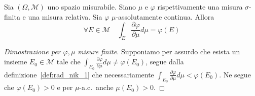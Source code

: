 \begin{theorem}\label{thm:rad_nik_ac}
    Sia \((\Omega, \mathcal{M})\) uno spazio misurabile. Siano \(\mu\) e
    \(\varphi\) rispettivamente una misura \(\sigma\)-finita e una misura
    relativa. Sia \(\varphi \) \(\mu\)-assolutamente continua. Allora
    \[
        \forall E \in \mathcal{M} \quad \int_E \frac{\partial \varphi }{\partial
        \mu} d\mu = \varphi(E)
    \]
\end{theorem}
\begin{proof}[Dimostrazione per \(\varphi , \mu\) misure finite]
    Supponiamo per assurdo che esista un insieme \(E_{0} \in \mathcal{M}\) tale
    che \(\int_{E_{0}} \frac{\partial \varphi }{\partial \mu} d\mu \neq \varphi
    (E_{0})\), segue dalla definizione~\ref{def:rad_nik_1} che necessariamente
    \(\int_{E_{0}} \frac{\partial \varphi }{\partial
    \mu} d\mu < \varphi (E_{0})\). Ne segue che \(\varphi (E_{0}) >0\) e per
    \(\mu\)-a.c.~anche \(\mu(E_{0}) > 0\).


\end{proof}
